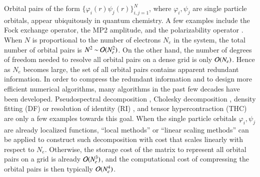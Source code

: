 Orbital pairs of the form $\{\varphi_{i}(r)\psi_{j}(r)\}_{i,j=1}^{N}$, where
$\varphi_{i}, \psi_{j}$ are single particle orbitals, appear ubiquitously in
quantum chemistry. A few examples include the Fock exchange operator, the MP2
amplitude, and the polarizability operator \cite{SzaboOstlund1989,Martin2004}.
When $N$ is proportional to the number of electrons $N_{e}$ in the system, the
total number of orbital pairs is $N^2\mathbin{\sim}\mathcal{O}(N_{e}^2)$. On the other
hand, the number of degrees of freedom needed to resolve all orbital pairs on a
dense grid is only $\mathcal{O}(N_{e})$.  Hence as $N_{e}$ becomes large, the set of
all orbital pairs contains apparent redundant information. In order to compress
the redundant information and to design more efficient numerical algorithms,
many algorithms in the past few decades have been developed. Pseudospectral
decomposition \cite{MurphyJCP1995,ReynoldsJCP1996}, Cholesky decomposition 
\cite{BeebeLinderberg1977,KochSanchezdePedersen2003,AquilantePedersenLindh2007,
ManzerHornMardirossianEtAl2015}, density fitting (DF) or resolution of identity
(RI) \cite{NJP_14_053020_2012,Weigend2002}, and tensor hypercontraction (THC) 
\cite{ParrishHohensteinMartinezEtAl2012,ParrishHohensteinMartinezEtAl2013} are
only a few examples towards this goal. When the single particle orbitals
$\varphi_{i},\psi_{j}$ are already localized functions, ``local methods'' or
``linear scaling methods'' \cite{Goedecker1999, RPP_75_036503_2010_ON,
GuidonHutterVandevondele2010, CP_356_98_2009} can be applied to construct such
decomposition with cost that scales linearly with respect to $N_{e}$. Otherwise,
the storage cost of the matrix to represent all orbital pairs on a grid is
already $\mathcal{O}(N_{e}^3)$, and the computational cost of compressing the orbital
pairs is then typically $\mathcal{O}(N_{e}^{4})$.

